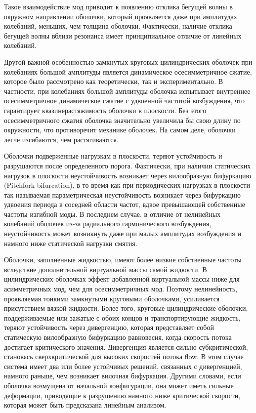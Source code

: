 Такое взаимодействие мод приводит к появлению отклика бегущей волны в окружном направлении оболочки, который проявляется даже при амплитудах колебаний, меньших, чем толщина оболочки. Фактически, наличие отклика бегущей волны вблизи резонанса имеет принципиальное отличие от линейных колебаний. 


Другой важной особенностью замкнутых круговых цилиндрических оболочек при колебаниях большой амплитуды является динамическое осесимметричное сжатие, которое было рассмотрено как теоретически, так и экспериментально. В частности, при колебаниях большой амплитуды оболочка испытывает внутреннее осесимметричное динамическое сжатие с удвоенной частотой возбуждения, что гарантирует квазинерастяжимость оболочки в плоскости. Без этого осесимметричного сжатия оболочка значительно увеличила бы свою длину по окружности, что противоречит механике оболочек. На самом деле, оболочки легче изгибаются, чем растягиваются.

Оболочки подверженные нагрузкам в плоскости, теряют устойчивость и разрушаются после определенного порога. Фактически, при наличии статических нагрузок в плоскости неустойчивость возникает через вилообразную бифуркацию (Pitchfork bifurcation), в то время как при периодических нагрузках в плоскости так называемая параметрическая неустойчивость возникает через бифуркацию удвоения периода в соседней области частот, вдвое превышающей собственные частоты изгибной моды. В последнем случае, в отличие от нелинейных колебаний оболочек из-за радиального гармонического возбуждения, неустойчивость может возникнуть даже при малых амплитудах возбуждения и намного ниже статической нагрузки смятия.


Оболочки, заполненные жидкостью, имеют более низкие собственные частоты вследствие дополнительной виртуальной массы самой жидкости. В цилиндрических оболочках эффект добавленной виртуальной массы ниже для асимметричных мод, чем для осесимметричных мод. Поэтому нелинейность, проявляемая тонкими замкнутыми круговыми оболочками, усиливается присутствием вязкой жидкости. Более того, круговые цилиндрические оболочки, поддерживаемые или зажатые с обоих концов и транспортирующие жидкость, теряют устойчивость через дивергенцию, которая представляет собой статическую вилообразную бифуркацию равновесия, когда скорость потока  достигает критического значения. Дивергенция является сильно субкритической, становясь сверхкритической для высоких скоростей потока ﬂow.  В этом случае система имеет два или более устойчивых решений, связанных с дивергенцией, намного раньше, чем возникает вилочная бифуркация. Другими словами, если оболочка возмущена от начальной конфигурации, она может иметь сильные деформации, приводящие к разрушению намного ниже критической скорости, которая может быть предсказана линейным анализом.

